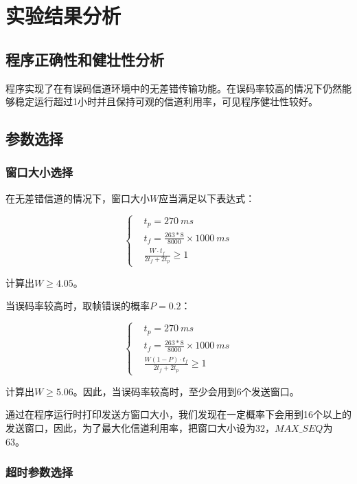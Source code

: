 \documentclass[lang=cn,11pt,a4paper,cite=authornum]{paper}
\begin{document}
\section{实验结果分析}

\subsection{程序正确性和健壮性分析}

程序实现了在有误码信道环境中的无差错传输功能。在误码率较高的情况下仍然能够稳定运行超过1小时并且保持可观的信道利用率，可见程序健壮性较好。

\subsection{参数选择}

\subsubsection{窗口大小选择}

在无差错信道的情况下，窗口大小$W$应当满足以下表达式：

$$
    \left\{
    \begin{aligned}
         & t_p = 270\ ms                       \\
         & t_f = \frac{263*8}{8000}\times 1000\ ms        \\
         & \frac{W\cdot t_f}{2t_f+2t_p} \geq 1
    \end{aligned}
    \right.
$$

计算出$W\geq 4.05$。

当误码率较高时，取帧错误的概率$P=0.2$：

$$
    \left\{
    \begin{aligned}
         & t_p = 270\ ms                       \\
         & t_f = \frac{263*8}{8000}\times 1000\ ms        \\
         & \frac{W(1-P)\cdot t_f}{2t_f+2t_p} \geq 1
    \end{aligned}
    \right.
$$

计算出$W\geq 5.06$。因此，当误码率较高时，至少会用到6个发送窗口。

通过在程序运行时打印发送方窗口大小，我们发现在一定概率下会用到16个以上的发送窗口，因此，为了最大化信道利用率，把窗口大小设为32，$MAX\_SEQ$为63。

\subsubsection{超时参数选择}
\end{document}
